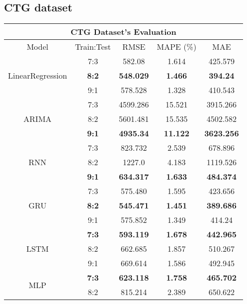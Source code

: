 \documentclass{ieeeojies}
\begin{document}
\subsection{CTG dataset}
\begin{table}[H]
    \centering
    \renewcommand{\arraystretch}{1.1}
    \begin{tabular}{|c|c|c|c|c|}
         \hline
         \multicolumn{5}{|c|}{\textbf{CTG Dataset's Evaluation}}\\
         \hline
         \centering Model & Train:Test & RMSE & MAPE (\%) & MAE\\
         \hline
         \multirow{3}{*}{LinearRegression} 
         & 7:3 & 582.08 & 1.614 & 425.579 \\ 
         & \textbf{8:2} & \textbf{548.029} & \textbf{1.466} & \textbf{394.24} \\ 
         & 9:1 & 578.528 & 1.328 & 410.543\\
         \hline
         \multirow{3}{*}{ARIMA} 
         & 7:3 & 4599.286 & 15.521 & 3915.266\\ 
         & 8:2 & 5601.481 & 15.535 & 4502.582 \\ 
         & \textbf{9:1} & \textbf{4935.34} & \textbf{11.122} & \textbf{3623.256}\\
         \hline
         \multirow{3}{*}{RNN} 
         & 7:3 & 823.732 & 2.539 & 678.896 \\ 
         & 8:2 & 1227.0 & 4.183 & 1119.526 \\ 
         & \textbf{9:1} & \textbf{634.317}  & \textbf{1.633} & \textbf{484.374}\\
         \hline
         \multirow{3}{*}{GRU} 
         & 7:3 &  575.480 &  1.595 & 423.656 \\ 
         & \textbf{8:2} &  \textbf{545.471} & \textbf{1.451} & \textbf{389.686} \\ 
         & 9:1 & 575.852  & 1.349 & 414.24\\
         \hline
         \multirow{3}{*}{LSTM} 
         & \textbf{7:3} & \textbf{593.119} & \textbf{1.678} & \textbf{442.965} \\ 
         & 8:2 & 662.685 & 1.857 & 510.267 \\ 
         & 9:1 & 669.614 & 1.586 & 492.945\\
         \hline
         \multirow{3}{*}{MLP} 
         & \textbf{7:3} & \textbf{623.118} & \textbf{1.758} & \textbf{465.702} \\ 
         & 8:2 &	815.214 & 2.389 & 650.622 \\ 

\end{tabular}
\end{table}
\end{document}
